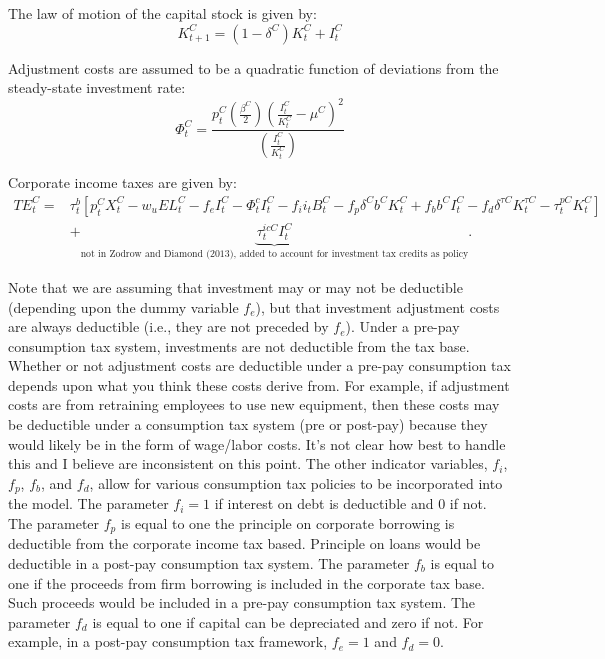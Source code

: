 The law of motion of the capital stock is given by:
\begin{equation}
\label{eqn:lom_capital}
K^{C}_{t+1}=(1-\delta^{C})K^{C}_{t} + I^{C}_{t}
\end{equation}

Adjustment costs are assumed to be a quadratic function of deviations from the steady-state investment rate:
\begin{equation}
\label{eqn:adj_cost}
\Phi^{C}_{t}=\frac{p^{C}_{t}\left(\frac{\beta^{C}}{2}\right)\left(\frac{I^{C}_{t}}{K^{C}_{t}}-\mu^{C}\right)^{2}}{\left(\frac{I^{C}_{t}}{K^{C}_{t}}\right)}
\end{equation}

Corporate income taxes are given by:
\begin{equation}
\label{eqn:corp_tax}
\begin{split}
TE^{C}_{t}= & \tau^{b}_{t}\left[p^{C}_{t}X^{C}_{t}-w_{u}EL^{C}_{t}-f_{e}I^{C}_{t}-\Phi^{c}_{t}I^{C}_{t}-f_{i}i_{t}B^{C}_{t}-f_{p}\delta^{C}b^{C}K^{C}_{t}+f_{b}b^{C}I^{C}_{t}-f_{d}\delta^{\tau C}K^{\tau C}_{t}-\tau^{pC}_{t}K^{C}_{t}\right] \\
& +\underbrace{\tau^{icC}_{t}I^{C}_{t}}_{\text{not in Zodrow and Diamond (2013), added to account for investment tax credits as policy}}.
\end{split}
\end{equation}

\noindent\noindent  Note that we are assuming that investment may or may not be deductible (depending upon the dummy variable $f_{e}$), but that investment adjustment costs are always deductible (i.e., they are not preceded by $f_{e}$).  Under a pre-pay consumption tax system, investments are not deductible from the tax base.  Whether or not adjustment costs are deductible under a pre-pay consumption tax depends upon what you think these costs derive from.  For example, if adjustment costs are from retraining employees to use new equipment, then these costs may be deductible under a consumption tax system (pre or post-pay) because they would likely be in the form of wage/labor costs. It's not clear how best to handle this and I believe \citet{DZ2013} are inconsistent on this point.  The other indicator variables, $f_{i}$, $f_{p}$, $f_{b}$, and $f_{d}$, allow for various consumption tax policies to be incorporated into the model.  The parameter $f_{i}=1$ if interest on debt is deductible and 0 if not.  The parameter $f_{p}$ is equal to one the principle on corporate borrowing is deductible from the corporate income tax based.  Principle on loans would be deductible in a post-pay consumption tax system.  The parameter $f_{b}$ is equal to one if the proceeds from firm borrowing is included in the corporate tax base.  Such proceeds would be included in a pre-pay consumption tax system.  The parameter $f_{d}$ is equal to one if capital can be depreciated and zero if not.  For example, in a post-pay consumption tax framework, $f_{e}=1$ and $f_{d}=0$.  

